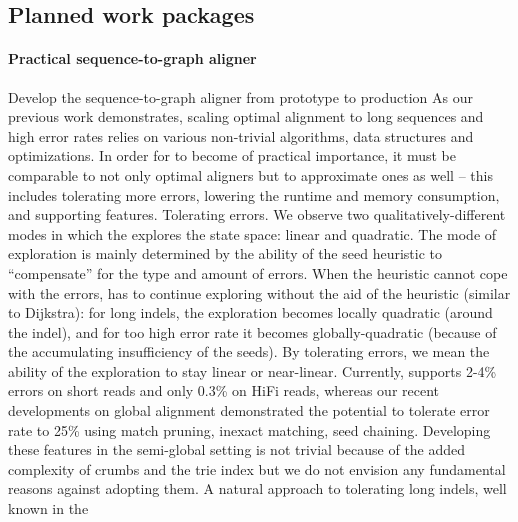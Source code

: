 
\subsection*{Planned work packages}

\paragraph{Practical sequence-to-graph aligner}
Develop the \astarix sequence-to-graph aligner from prototype to production As
our previous work demonstrates, scaling optimal \A alignment to long sequences
and high error rates relies on various non-trivial algorithms, data structures
and optimizations. In order for \astarix to become of practical importance, it
must be comparable to not only optimal aligners but to approximate ones as well
– this includes tolerating more errors, lowering the runtime and memory
consumption, and supporting features. Tolerating errors. We observe two
qualitatively-different modes in which the \A explores the state space: linear
and quadratic. The mode of exploration is mainly determined by the ability of
the seed heuristic to “compensate” for the type and amount of errors. When the
heuristic cannot cope with the errors, \A has to continue exploring without the
aid of the heuristic (similar to Dijkstra): for long indels, the exploration
becomes locally quadratic (around the indel), and for too high error rate it
becomes globally-quadratic (because of the accumulating insufficiency of the
seeds). By tolerating errors, we mean the ability of the exploration to stay
linear or near-linear. Currently, \astarix supports 2-4\% errors on short reads
and only 0.3\% on HiFi reads, whereas our recent developments on global
alignment demonstrated the potential to tolerate error rate to 25\% using match
pruning, inexact matching, seed chaining. Developing these features in the
semi-global setting is not trivial because of the added complexity of crumbs and
the trie index but we do not envision any fundamental reasons against adopting
them. A natural approach to tolerating long indels, well known in the
